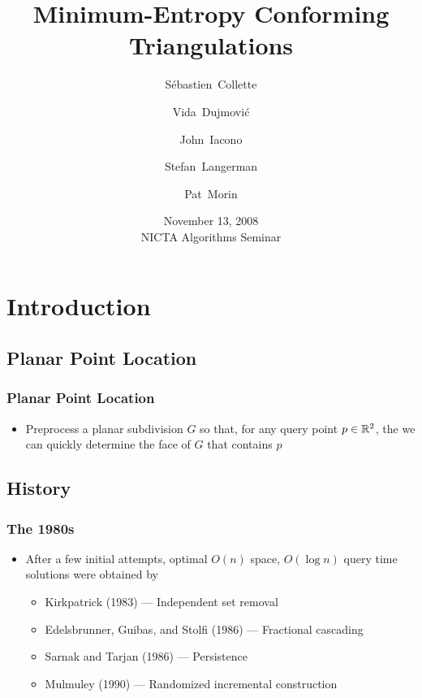 \documentclass{beamer}
\title{Minimum-Entropy Conforming Triangulations}
\author{S\'ebastien~Collette 
	\and Vida~Dujmovi\'c 
	\and John~Iacono
	\and Stefan~Langerman
	\and Pat~Morin}
\date{November 13, 2008 \\ NICTA Algorithms Seminar}
\begin{document}
\frame{\titlepage}

\section[Outline]{}
\frame{\tableofcontents}

\section{Introduction}
\subsection{Planar Point Location}
\frame
{
  \frametitle{Planar Point Location}
  \begin{itemize}
  \item Preprocess a planar subdivision $G$ so that, for any query
point $p\in\mathbb{R}^2$, the we can quickly determine the face of $G$
that contains $p$
  \begin{center}
  \end{center}
  \end{itemize}
}

\subsection{History}

\frame
{
  \frametitle{The 1980s}
  \begin{itemize}
  \item<1-> After a few initial attempts, optimal $O(n)$ space, $O(\log
n)$ query time solutions were obtained by
  \begin{itemize}
   \item<2-> Kirkpatrick (1983) --- Independent set removal
   \item<3-> Edelsbrunner, Guibas, and Stolfi (1986) --- Fractional cascading
   \item<4-> Sarnak and Tarjan (1986) --- Persistence
   \item<5-> Mulmuley (1990) --- Randomized incremental construction
  \end{itemize}
  \end{itemize}
}
\end{document}
